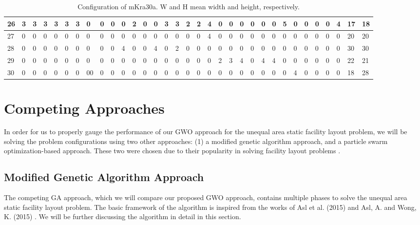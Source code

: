 \begin{table}[h!]
\begin{adjustwidth}{0.3in}{}
{{\begin{tabular}{l|l|l|l|l|l|l|l|l|l|l|l|l|l|l|l|l|l|l|l|l|l|l|l|l|l|l|l|l|l|l|l|l|}
	\hline
	\multicolumn{1}{|l|}{26}                                    & 3 & 3 & 3 & 3 & 3 & 3 & 0  & 0 & 0 & 0  & 2  & 0  & 0  & 3  & 3  & 2  & 2  & 4  & 0  & 0  & 0  & 0  & 0  & 0  & 5  & 0  & 0  & 0  & 0  & 4  & 17                 & 18                  \\ 
	\hline
	\multicolumn{1}{|l|}{27}                                    & 0 & 0 & 0 & 0 & 0 & 0 & 0  & 0 & 0 & 0  & 0  & 0  & 0  & 0  & 0  & 0  & 0  & 4  & 0  & 0  & 0  & 0  & 0  & 0  & 0  & 0  & 0  & 0  & 0  & 0  & 20                 & 20                  \\ 
	\hline
	\multicolumn{1}{|l|}{28}                                    & 0 & 0 & 0 & 0 & 0 & 0 & 0  & 0 & 0 & 4  & 0  & 0  & 4  & 0  & 2  & 0  & 0  & 0  & 0  & 0  & 0  & 0  & 0  & 0  & 0  & 0  & 0  & 0  & 0  & 0  & 30                 & 30                  \\ 
	\hline
	\multicolumn{1}{|l|}{29}                                    & 0 & 0 & 0 & 0 & 0 & 0 & 0  & 0 & 0 & 0  & 0  & 0  & 0  & 0  & 0  & 0  & 0  & 0  & 2  & 3  & 4  & 0  & 4  & 4  & 0  & 0  & 0  & 0  & 0  & 0  & 22                 & 21                  \\ 
	\hline
	\multicolumn{1}{|l|}{30}                                    & 0 & 0 & 0 & 0 & 0 & 0 & 00 & 0 & 0 & 0  & 0  & 0  & 0  & 0  & 0  & 0  & 0  & 0  & 0  & 0  & 0  & 0  & 0  & 0  & 0  & 4  & 0  & 0  & 0  & 0  & 18                 & 28                  \\
	\hline
\end{tabular}}}
\end{adjustwidth}
\caption{Configuration of mKra30a. W and H mean width and height, respectively.}
\label{dataset-mleekra30a}
\end{table}

\section{Competing Approaches}
In order for us to properly gauge the performance of our GWO approach for the unequal area static facility layout problem, we will be solving the problem configurations using two other approaches: (1) a modified genetic algorithm approach, and a particle swarm optimization-based approach. These two were chosen due to their popularity in solving facility layout problems \cite{Hosseini-Nasab2018}.

\subsection{Modified Genetic Algorithm Approach}
The competing GA approach, which we will compare our proposed GWO approach, contains multiple phases to solve the unequal area static facility layout problem. The basic framework of the algorithm is inspired from the works of Asl et al. (2015) \cite{Asl2015} and Asl, A. and Wong, K. (2015) \cite{Asl2015a}. We will be further discussing the algorithm in detail in this section.

